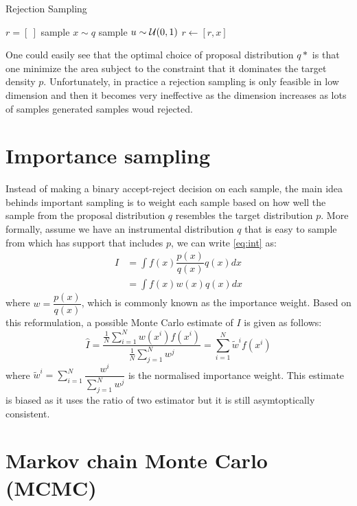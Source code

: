 \begin{algorithm}
\caption{Rejection Sampling}\label{algo:rejectionsampling}
\begin{algorithmic}[1]
\State $r = [\ ]$
\Repeat
  \State sample $x \sim q$
  \State sample $u \sim {\cal U}(0,1)$
    \State $r \gets [r,x]$
  \EndIf
{}
\EndFunction
\end{algorithmic}
\end{algorithm}

One could easily see that the optimal choice of proposal distribution $q*$ is that one minimize the area subject to the constraint that it dominates the target density $p$. Unfortunately, in practice a rejection sampling is only feasible in low dimension and then it becomes very ineffective as the dimension increases as lots of samples generated samples woud rejected.

\section{Importance sampling}
Instead of making a binary accept-reject decision on each sample, the main idea behinds important sampling is to weight each sample based on how well the sample from the proposal distribution $q$ resembles the target distribution $p$. More formally, assume we have an instrumental distribution $q$ that is easy to sample from which has support that includes $p$, we can write \eqref{eq:int} as:
\begin{align}
  I &= \int f(x)\dfrac{p(x)}{q(x)}q(x) dx \nonumber \\
    &= \int f(x)w(x)q(x) dx
\end{align}
where $w=\dfrac{p(x)}{q(x)}$, which is commonly known as the importance weight. Based on this reformulation, a possible Monte Carlo estimate of $I$ is given as follows:
\begin{equation}
  \hat{I} = \dfrac{\frac{1}{N} \sum^N_{i=1} w(x^i)f(x^i)}{\frac{1}{N} \sum^N_{j=1} w^j} = \sum^N_{i=1} \tilde{w}^i f(x^i)
\label{eq:is}
\end{equation}
where $\tilde{w}^i=\displaystyle\sum^N_{i=1}\dfrac{w^i}{\sum^N_{j=1}w^j}$ is the normalised importance weight. This estimate is biased as it uses the ratio of two estimator but it is still asymtoptically consistent.

\section{Markov chain Monte Carlo (MCMC)}

